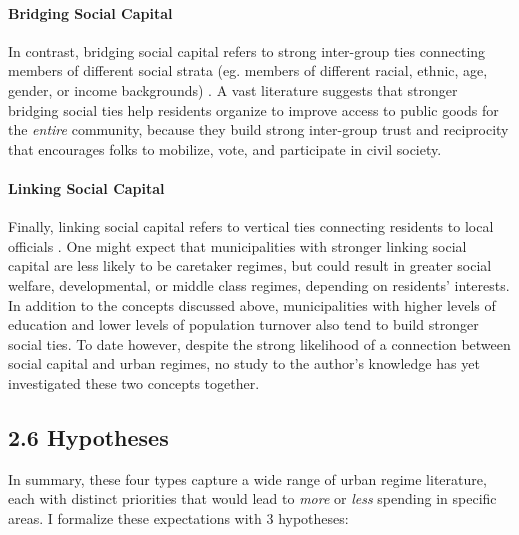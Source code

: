 \documentclass[preprint, 3p,
authoryear]{elsarticle} %
\begin{document}
\hypertarget{bridging-social-capital}{%
\paragraph{Bridging Social Capital}\label{bridging-social-capital}}

In contrast, bridging social capital refers to strong inter-group ties
connecting members of different social strata (eg. members of different
racial, ethnic, age, gender, or income backgrounds)
\citep{putnam_2000, aldrich_2019}. A vast literature suggests that
stronger bridging social ties help residents organize to improve access
to public goods for the \emph{entire} community, because they build
strong inter-group trust and reciprocity that encourages folks to
mobilize, vote, and participate in civil society.

\hypertarget{linking-social-capital}{%
\paragraph{Linking Social Capital}\label{linking-social-capital}}

Finally, linking social capital refers to vertical ties connecting
residents to local officials \citep{woolcock_2010, aldrich_2019}. One
might expect that municipalities with stronger linking social capital
are less likely to be caretaker regimes, but could result in greater
social welfare, developmental, or middle class regimes, depending on
residents' interests. In addition to the concepts discussed above,
municipalities with higher levels of education and lower levels of
population turnover also tend to build stronger social ties. To date
however, despite the strong likelihood of a connection between social
capital and urban regimes, no study to the author's knowledge has yet
investigated these two concepts together.

\hypertarget{hypotheses}{%
\subsection{2.6 Hypotheses}\label{hypotheses}}

In summary, these four types capture a wide range of urban regime
literature, each with distinct priorities that would lead to \emph{more}
or \emph{less} spending in specific areas. I formalize these
expectations with 3 hypotheses:
\end{document}
